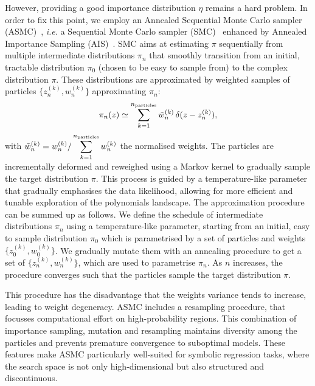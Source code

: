 \documentclass[11pt,a4paper]{article}
\begin{document}
	However, providing a good importance distribution $\eta$ remains a hard problem. In order to fix this point, we employ an Annealed Sequential Monte Carlo sampler (ASMC)~\cite{zimmermann2021nested,syed2024optimisedannealedsequentialmonte}, \textit{i.e.} a Sequential Monte Carlo sampler (SMC)~\cite{del2006sequential,DoucetTutorial,naesseth2024elementssequentialmontecarlo} enhanced by Annealed Importance Sampling (AIS)~\cite{neal1998annealedimportancesampling}. SMC aims at estimating $\pi$ sequentially from multiple intermediate distributions $\pi_{n}$ that smoothly transition from an initial, tractable distribution $\pi_{0}$ (chosen to be easy to sample from) to the complex distribution $\pi$. These distributions are approximated by weighted samples of particles $\big\{z^{(k)}_{n},w^{(k)}_{n}\big\}$ approximating $\pi_{n}$:
	\begin{equation} \label{eq:pifromweights}
		\pi_{n}(z) \simeq \sum_{k=1}^{n_{\rm particles}} \tilde{w}^{(k)}_{n}\,\delta(z-z^{(k)}_{n}),
	\end{equation}
	with  $\displaystyle \tilde{w}^{(k)}_n  = w^{(k)}_n/\sum_{k=1}^{n_{\rm particles}} w^{(k)}_{n}$ the normalised weights. The particles are incrementally deformed and reweighed using a Markov kernel to gradually sample the target distribution $\pi$. This process is guided by a temperature-like parameter that gradually emphasises the data likelihood, allowing for more efficient and tunable exploration of the polynomials landscape. The approximation procedure can be summed up as follows. We define the schedule of intermediate distributions $\pi_{n}$ using a temperature-like parameter, starting from an initial, easy to sample distribution $\pi_0$ which is parametrised by a set of particles and weights $\big\{z_0^{(k)},w_0^{(k)}\big\}$. We gradually mutate them with an annealing procedure to get a set of $\{z_n^{(k)},w_n^{(k)}\}$, which are used to parametrise $\pi_n$. As $n$ increases, the procedure converges such that the particles sample the target distribution $\pi$. 
	
	This procedure has the disadvantage that the weights variance tends to increase, leading to weight degeneracy. ASMC includes a resampling procedure, that focusses computational effort on high-probability regions.  This combination of importance sampling, mutation and resampling maintains diversity among the particles and prevents premature convergence to suboptimal models. These features make ASMC particularly well-suited for symbolic regression tasks, where the search space is not only high-dimensional but also structured and discontinuous.
\end{document}
